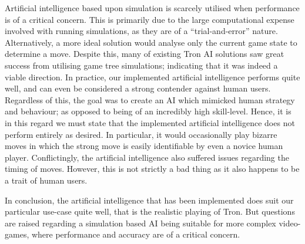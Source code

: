 \documentclass{standalone}
\begin{document}
		Artificial intelligence based upon simulation is scarcely utilised when performance is of a critical concern. This is primarily due to the large computational expense involved with running simulations, as they are of a \enquote{trial-and-error} nature. Alternatively, a more ideal solution would analyse only the current game state to determine a move. Despite this, many of existing Tron AI solutions saw great success from utilising game tree simulations; indicating that it was indeed a viable direction. In practice, our implemented artificial intelligence performs quite well, and can even be considered a strong contender against human users. Regardless of this, the goal was to create an AI which mimicked human strategy and behaviour; as opposed to being of an incredibly high skill-level. Hence, it is in this regard we must state that the implemented artificial intelligence does not perform entirely as desired. In particular, it would occasionally play bizarre moves in which the strong move is easily identifiable by even a novice human player. Conflictingly, the artificial intelligence also suffered issues regarding the timing of moves. However, this is not strictly a bad thing as it also happens to be a trait of human users.

		In conclusion, the artificial intelligence that has been implemented does suit our particular use-case quite well, that is the realistic playing of Tron. But questions are raised regarding a simulation based AI being suitable for more complex video-games, where performance and accuracy are of a critical concern.
\end{document}

